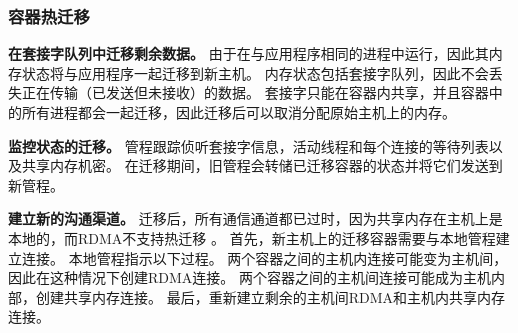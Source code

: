 

\subsubsection{容器热迁移}
\label{socksdirect:subsubsec:container_live_migration}


\textbf {在套接字队列中迁移剩余数据。}
由于\libipc {}在与应用程序相同的进程中运行，因此其内存状态将与应用程序一起迁移到新主机。
内存状态包括套接字队列，因此不会丢失正在传输（已发送但未接收）的数据。
套接字只能在容器内共享，并且容器中的所有进程都会一起迁移，因此迁移后可以取消分配原始主机上的内存。

\textbf {监控状态的迁移。}
管程跟踪侦听套接字信息，活动线程和每个连接的等待列表以及共享内存机密。
在迁移期间，旧管程会转储已迁移容器的状态并将它们发送到新管程。

\textbf {建立新的沟通渠道。}
迁移后，所有通信通道都已过时，因为共享内存在主机上是本地的，而RDMA不支持热迁移 \cite{nsdi19freeflow,slim}。
首先，新主机上的迁移容器需要与本地管程建立连接。
本地管程指示以下过程。
两个容器之间的主机内连接可能变为主机间，因此\libipc {}在这种情况下创建RDMA连接。
两个容器之间的主机间连接可能成为主机内部，\libipc {}创建共享内存连接。
最后，\libipc {}重新建立剩余的主机间RDMA和主机内共享内存连接。


%

